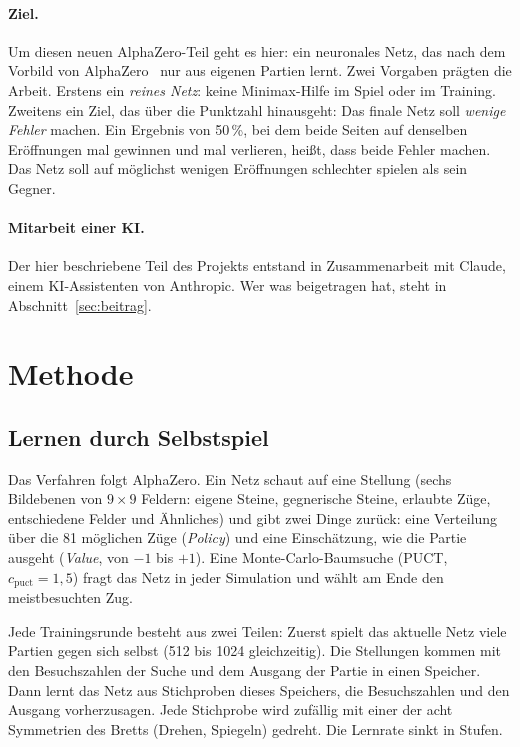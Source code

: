 \documentclass[11pt,a4paper]{article}
\begin{document}
\paragraph{Ziel.} Um diesen neuen AlphaZero-Teil geht es hier: ein neuronales Netz, das nach dem Vorbild
von AlphaZero~\cite{alphazero} nur aus eigenen Partien lernt. Zwei Vorgaben prägten die Arbeit.
Erstens ein \emph{reines Netz}: keine Minimax-Hilfe im Spiel oder im Training. Zweitens ein Ziel, das über
die Punktzahl hinausgeht: Das finale Netz soll \emph{wenige Fehler} machen. Ein Ergebnis von 50\,\%, bei
dem beide Seiten auf denselben Eröffnungen mal gewinnen und mal verlieren, heißt, dass beide Fehler
machen. Das Netz soll auf möglichst wenigen Eröffnungen schlechter spielen als sein Gegner.

\paragraph{Mitarbeit einer KI.} Der hier beschriebene Teil des Projekts entstand in Zusammenarbeit mit
Claude, einem KI-Assistenten von Anthropic. Wer was beigetragen hat, steht in
Abschnitt~\ref{sec:beitrag}.

\section{Methode}

\subsection{Lernen durch Selbstspiel}

Das Verfahren folgt AlphaZero. Ein Netz schaut auf eine Stellung (sechs Bildebenen von $9\times9$
Feldern: eigene Steine, gegnerische Steine, erlaubte Züge, entschiedene Felder und Ähnliches) und gibt
zwei Dinge zurück: eine Verteilung über die 81 möglichen Züge (\emph{Policy}) und eine Einschätzung, wie
die Partie ausgeht (\emph{Value}, von $-1$ bis $+1$). Eine Monte-Carlo-Baumsuche (PUCT, $c_\text{puct}=1{,}5$)
fragt das Netz in jeder Simulation und wählt am Ende den meistbesuchten Zug.

Jede Trainingsrunde besteht aus zwei Teilen: Zuerst spielt das aktuelle Netz viele Partien gegen sich
selbst (512 bis 1024 gleichzeitig). Die Stellungen kommen mit den Besuchszahlen der Suche und dem
Ausgang der Partie in einen Speicher. Dann lernt das Netz aus Stichproben dieses Speichers, die
Besuchszahlen und den Ausgang vorherzusagen. Jede Stichprobe wird zufällig mit einer der acht
Symmetrien des Bretts (Drehen, Spiegeln) gedreht. Die Lernrate sinkt in Stufen.
\end{document}
